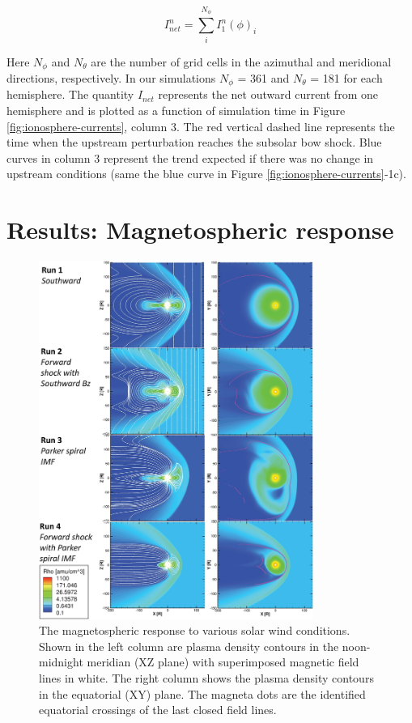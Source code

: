 \begin{equation}
    I_{net}^n = \sum_i^{N_\phi} I_1^n(\phi)_i
\end{equation}

Here $N_\phi$ and $N_\theta$ are the number of grid cells in the azimuthal and meridional directions, respectively. In our simulations $N_\phi$ = 361 and $N_\theta$ = 181 for each hemisphere. The quantity $I_{net}$ represents the net outward current from one hemisphere and is plotted as a function of simulation time in Figure \ref{fig:ionosphere-currents}, column 3. The red vertical dashed line represents the time when the upstream perturbation reaches the subsolar bow shock. Blue curves in column 3 represent the trend expected if there was no change in upstream conditions (same the blue curve in Figure \ref{fig:ionosphere-currents}‐1c).

\section{Results: Magnetospheric response}

\begin{figure}
    \centering
    \includegraphics[width=0.8\textwidth]{images3/mhd-solarwind-upstream.jpg}
    \caption{The magnetospheric response to various solar wind conditions. Shown in the left column are plasma density contours in the noon-midnight meridian (XZ plane) with superimposed magnetic field lines in white. The right column shows the plasma density contours in the equatorial (XY) plane. The magneta dots are the identified equatorial crossings of the last closed field lines.}
    \label{fig:mhd-solarwind-upstream}
\end{figure}

